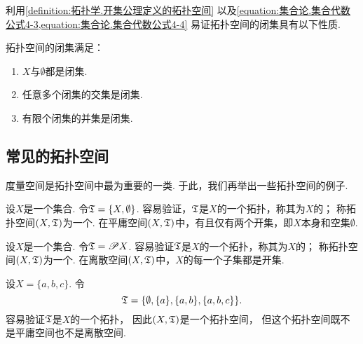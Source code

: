 利用\cref{definition:拓扑学.开集公理定义的拓扑空间}
以及\cref{equation:集合论.集合代数公式4-3,equation:集合论.集合代数公式4-4}
易证拓扑空间的闭集具有以下性质.
\begin{property}
拓扑空间的闭集满足：\begin{enumerate}
	\item \(X\)与\(\emptyset\)都是闭集.
	\item 任意多个闭集的交集是闭集.
	\item 有限个闭集的并集是闭集.
\end{enumerate}
\end{property}

\subsection{常见的拓扑空间}
度量空间是拓扑空间中最为重要的一类.
于此，我们再举出一些拓扑空间的例子.

\begin{example}[平庸空间]
设\(X\)是一个集合.
令\(\mathfrak T=\{X,\emptyset\}\).
容易验证，\(\mathfrak T\)是\(X\)的一个拓扑，称其为\(X\)的；
称拓扑空间\((X,\mathfrak T)\)为一个.
在平庸空间\((X,\mathfrak T)\)中，有且仅有两个开集，即\(X\)本身和空集\(\emptyset\).
\end{example}

\begin{example}[离散空间]
设\(X\)是一个集合.
令\(\mathfrak T=\mathscr{P} X\).
容易验证\(\mathfrak T\)是\(X\)的一个拓扑，称其为\(X\)的；
称拓扑空间\((X,\mathfrak T)\)为一个.
在离散空间\((X,\mathfrak T)\)中，\(X\)的每一个子集都是开集.
\end{example}

\begin{example}\label{example:拓扑学.常见的拓扑空间3}
设\(X = \{a,b,c\}\).
令\[
	\mathfrak T = \{
		\emptyset,
		\{a\},
		\{a,b\},
		\{a,b,c\}
	\}.
\]
容易验证\(\mathfrak T\)是\(X\)的一个拓扑，
因此\((X,\mathfrak T)\)是一个拓扑空间，
但这个拓扑空间既不是平庸空间也不是离散空间.
\end{example}

